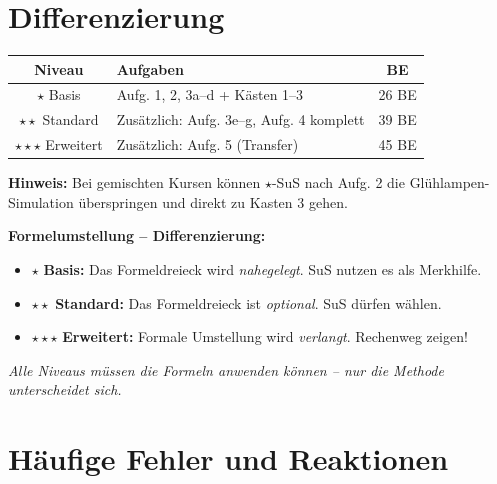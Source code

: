 \documentclass[11pt, a4paper]{article}
\begin{document}

\section*{Differenzierung}

\begin{tabularx}{\textwidth}{|c|X|c|}
\hline
\textbf{Niveau} & \textbf{Aufgaben} & \textbf{BE} \\
\hline
$\star$ Basis & Aufg. 1, 2, 3a--d + Kästen 1--3 & 26 BE \\
\hline
$\star\star$ Standard & Zusätzlich: Aufg. 3e--g, Aufg. 4 komplett & 39 BE \\
\hline
$\star\star\star$ Erweitert & Zusätzlich: Aufg. 5 (Transfer) & 45 BE \\
\hline
\end{tabularx}

\begin{infobox}
\textbf{Hinweis:} Bei gemischten Kursen können $\star$-SuS nach Aufg. 2 die Glühlampen-Simulation überspringen und direkt zu Kasten 3 gehen.
\end{infobox}

\begin{tipbox}
\textbf{Formelumstellung – Differenzierung:}
\begin{itemize}[leftmargin=1.5em, itemsep=2pt]
    \item $\star$ \textbf{Basis:} Das Formeldreieck wird \textit{nahegelegt}. SuS nutzen es als Merkhilfe.
    \item $\star\star$ \textbf{Standard:} Das Formeldreieck ist \textit{optional}. SuS dürfen wählen.
    \item $\star\star\star$ \textbf{Erweitert:} Formale Umstellung wird \textit{verlangt}. Rechenweg zeigen!
\end{itemize}
\textit{Alle Niveaus müssen die Formeln anwenden können – nur die Methode unterscheidet sich.}
\end{tipbox}


\section*{Häufige Fehler und Reaktionen}
\end{document}
